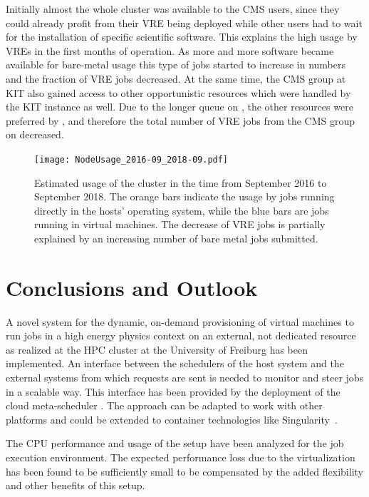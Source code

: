 Initially almost the whole \NEMO cluster was available to the CMS users, since they could already profit from their VRE being deployed while other users had to wait for the installation of specific scientific software.
This explains the high usage by VREs in the first months of operation. As more and more software became available for bare-metal usage this type of jobs started to increase in numbers and the fraction of VRE jobs decreased.
At the same time, the CMS group at KIT also gained access to other opportunistic resources which were handled by the KIT \Roced instance as well. Due to the longer queue on \NEMO, the other resources were preferred by \Roced, and therefore the total number of VRE jobs from the CMS group on \NEMO decreased.



\begin{figure}
\begin{center}
  \texttt{[image: NodeUsage\_2016-09\_2018-09.pdf]}
  \caption{Estimated usage of the \NEMO cluster in the time from September 2016
    to September 2018. The orange bars indicate the usage by jobs
    running directly in the hosts' operating system, while the blue bars are jobs
    running in virtual machines. The decrease of VRE jobs is partially explained
    by an increasing number of bare metal jobs submitted.}
  \label{fig-nodeusage}
\end{center}
\end{figure}

\section{Conclusions and Outlook}








A novel system for the dynamic, on-demand provisioning of virtual machines to run jobs
in a high energy physics context on an external, not dedicated resource as
realized at the HPC cluster \NEMO at the University of Freiburg has been
implemented. An interface between the schedulers of the
host system and the external systems from which requests are sent is needed to
monitor and steer jobs in a scalable way.
This interface has been provided by the deployment of the cloud meta-scheduler \Roced.
The approach can be adapted to work with other platforms and could be extended to
container technologies like Singularity~\cite{VRE2017}.

The CPU performance and usage of the setup have been analyzed for the job execution environment.
The expected performance loss due to the virtualization has been found to be
sufficiently small to be compensated by the added flexibility and other benefits
of this setup.

